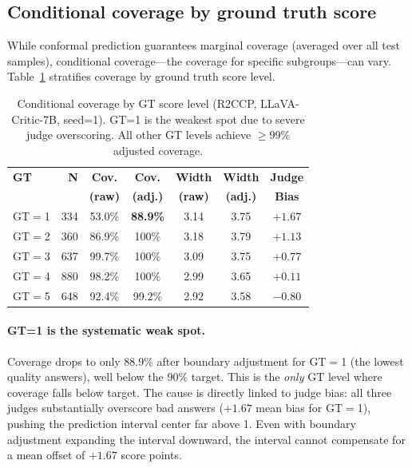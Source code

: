 \documentclass{article}
\begin{document}
\subsection{Conditional coverage by ground truth score}
\label{sec:conditional}

While conformal prediction guarantees marginal coverage (averaged over all test samples), conditional coverage---the coverage for specific subgroups---can vary. Table~\ref{tab:conditional} stratifies coverage by ground truth score level.

\begin{table}[t]
\centering
\caption{Conditional coverage by GT score level (R2CCP, LLaVA-Critic-7B, seed=1). GT=1 is the weakest spot due to severe judge overscoring. All other GT levels achieve $\geq$99\% adjusted coverage.}
\label{tab:conditional}
\small
\begin{tabular}{lrccccc}
\toprule
\textbf{GT} & \textbf{N} & \textbf{Cov.} & \textbf{Cov.} & \textbf{Width} & \textbf{Width} & \textbf{Judge} \\
& & \textbf{(raw)} & \textbf{(adj.)} & \textbf{(raw)} & \textbf{(adj.)} & \textbf{Bias} \\
\midrule
GT$=$1 & 334 & 53.0\% & \textbf{88.9\%} & 3.14 & 3.75 & $+1.67$ \\
GT$=$2 & 360 & 86.9\% & 100\% & 3.18 & 3.79 & $+1.13$ \\
GT$=$3 & 637 & 99.7\% & 100\% & 3.09 & 3.75 & $+0.77$ \\
GT$=$4 & 880 & 98.2\% & 100\% & 2.99 & 3.65 & $+0.11$ \\
GT$=$5 & 648 & 92.4\% & 99.2\% & 2.92 & 3.58 & $-0.80$ \\
\bottomrule
\end{tabular}
\end{table}

\paragraph{GT=1 is the systematic weak spot.} Coverage drops to only 88.9\% after boundary adjustment for GT$=$1 (the lowest quality answers), well below the 90\% target. This is the \emph{only} GT level where coverage falls below target. The cause is directly linked to judge bias: all three judges substantially overscore bad answers ($+1.67$ mean bias for GT$=$1), pushing the prediction interval center far above 1. Even with boundary adjustment expanding the interval downward, the interval cannot compensate for a mean offset of $+1.67$ score points.
\end{document}

